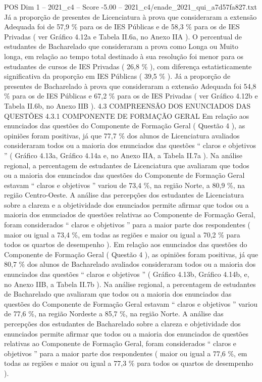 \begin{textsample}{POS Dim 1 – 2021\_c4 – Score -5.00 – 2021\_c4/enade\_2021\_qui\_a7d57fa827.txt}
Já a proporção de presentes de Licenciatura à prova que consideraram a extensão Adequada foi de 57,9 \% para os de IES Públicas e de 58,3 \% para os de IES Privadas ( ver Gráfico 4.12a e Tabela II.6a, no Anexo IIA ).
O percentual de estudantes de Bacharelado que consideraram a prova como Longa ou Muito longa, em relação ao tempo total destinado à sua resolução foi menor para os estudantes de cursos de IES Privadas ( 26,8 \% ), com diferença estatisticamente significativa da proporção em IES Públicas ( 39,5 \% ).
Já a proporção de presentes de Bacharelado à prova que consideraram a extensão Adequada foi 54,8 \% para os de IES Públicas e 67,2 \% para os de IES Privadas ( ver Gráfico 4.12b e Tabela II.6b, no Anexo IIB ). 4.3 COMPREENSÃO DOS ENUNCIADOS DAS QUESTÕES 4.3.1 COMPONENTE DE FORMAÇÃO GERAL Em relação aos enunciados das questões do Componente de Formação Geral ( Questão 4 ), as opiniões foram positivas, já que 77,7 \% dos alunos de Licenciatura avaliados consideraram todos ou a maioria dos enunciados das questões “ claros e objetivos ” ( Gráfico 4.13a, Gráfico 4.14a e, no Anexo IIA, a Tabela II.7a ).
Na análise regional, a percentagem de estudantes de Licenciatura que avaliaram que todos ou a maioria dos enunciados das questões do Componente de Formação Geral estavam “ claros e objetivos ” variou de 73,4 \%, na região Norte, a 80,9 \%, na região Centro-Oeste.
A análise das percepções dos estudantes de Licenciatura sobre a clareza e a objetividade dos enunciados permite afirmar que todos ou a maioria dos enunciados de questões relativas ao Componente de Formação Geral, foram considerados “ claros e objetivos ” para a maior parte dos respondentes ( maior ou igual a 73,4 \%, em todas as regiões e maior ou igual a 70,2 \% para todos os quartos de desempenho ).
Em relação aos enunciados das questões do Componente de Formação Geral ( Questão 4 ), as opiniões foram positivas, já que 80,7 \% dos alunos de Bacharelado avaliados consideraram todos ou a maioria dos enunciados das questões “ claros e objetivos ” ( Gráfico 4.13b, Gráfico 4.14b, e, no Anexo IIB, a Tabela II.7b ).
Na análise regional, a percentagem de estudantes de Bacharelado que avaliaram que todos ou a maioria dos enunciados das questões do Componente de Formação Geral estavam “ claros e objetivos ” variou de 77,6 \%, na região Nordeste a 85,7 \%, na região Norte.
A análise das percepções dos estudantes de Bacharelado sobre a clareza e objetividade dos enunciados permite afirmar que todos ou a maioria dos enunciados de questões relativas ao Componente de Formação Geral, foram considerados “ claros e objetivos ” para a maior parte dos respondentes ( maior ou igual a 77,6 \%, em todas as regiões e maior ou igual a 77,3 \% para todos os quartos de desempenho ).

\end{textsample}
